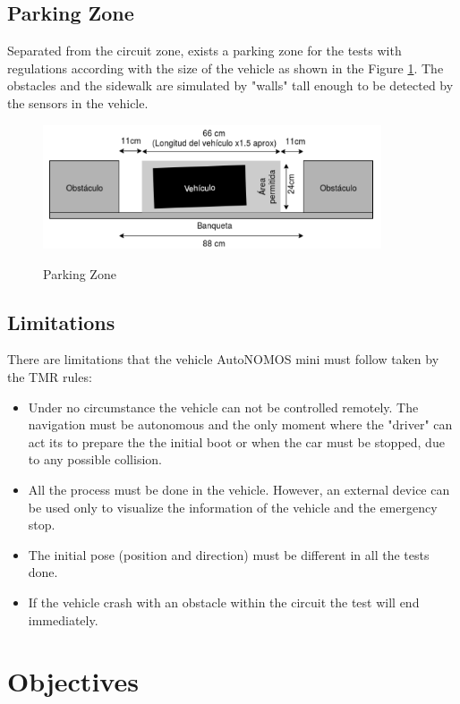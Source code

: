     \subsection{Parking Zone}
    Separated from the circuit zone, exists a parking zone for the tests with regulations according with the size of the vehicle as shown in the Figure \ref{fig:ParkingZone}. The obstacles and the sidewalk are simulated by "walls" tall enough to be detected by the sensors in the vehicle.
    \begin{figure}[h]
        \centering
        \includegraphics[width=10cm]{Figures/parking zone.PNG} \\[2mm]
        \caption{Parking Zone}
        \label{fig:ParkingZone}
    \end{figure}
    
    \subsection{Limitations}
    There are limitations that the vehicle AutoNOMOS mini must follow taken by the TMR rules\cite{AutoModelCarRuleBook2019}:
    \begin{itemize}
        \item Under no circumstance the vehicle can not be controlled remotely. The navigation must be autonomous and the only moment where the "driver" can act its to prepare the the initial boot or when the car must be stopped, due to any possible collision.
        \item All the process must be done in the vehicle. However, an external device can be used only to visualize the information of the vehicle and the emergency stop.
        \item The initial pose (position and direction) must be different in all the tests done.
        \item If the vehicle crash with an obstacle within the circuit the test will end immediately.
    \end{itemize}

\section{Objectives}
